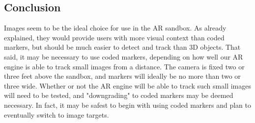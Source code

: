 \documentclass[letterpaper, 10pt, onecolumn, draftclsnofoot]{IEEEtran}
\begin{document}
\subsection{Conclusion}
Images seem to be the ideal choice for use in the AR sandbox. As already explained, they would provide users with more visual context than coded markers, but should be much easier to detect and track than 3D objects. That said, it may be necessary to use coded markers, depending on how well our AR engine is able to track small images from a distance. The camera is fixed two or three feet above the sandbox, and markers will ideally be no more than two or three wide. Whether or not the AR engine will be able to track such small images will need to be tested, and "downgrading" to coded markers may be deemed necessary. In fact, it may be safest to begin with using coded markers and plan to eventually switch to image targets.
\end{document}
